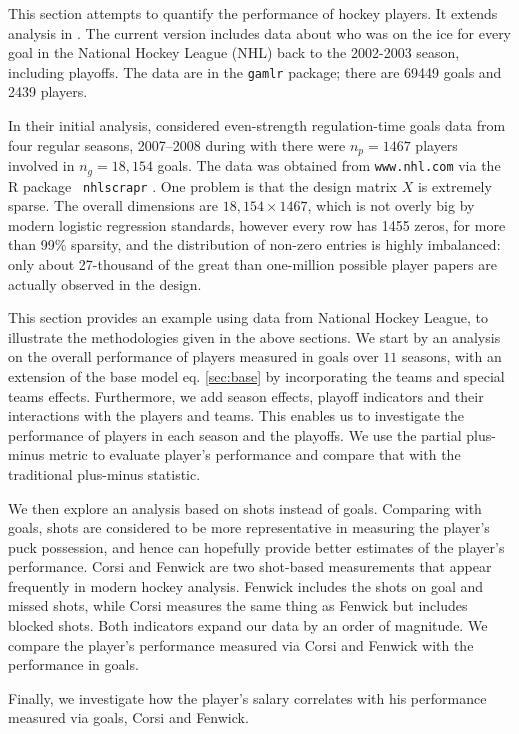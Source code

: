 This section attempts to quantify the
performance of hockey players.  It extends  analysis in
\cite{gramacy:jensen:taddy:2013}.  The current version includes data about who
was on the ice for every goal in the National Hockey League (NHL) back to the
2002-2003 season, including playoffs.  The data
are in the {\tt gamlr} package; there are
69449 goals and 2439 players.

In their
initial analysis, \cite{gramacy:jensen:taddy:2013} considered even-strength
regulation-time goals data from four regular seasons, 2007--2008 during
with there were $n_p = 1467$ players involved in $n_g = 18,\!154$ goals.  The
data was obtained from \verb!www.nhl.com! via the {\sf R} package {\tt
nhlscrapr} \cite{nhlscrapr}. One problem is that the design matrix $X$ is
extremely sparse. The overall dimensions are $18,\!154 \times 1467$, which is
not overly big by modern logistic regression standards, however every row
has 1455 zeros, for more than 99\% sparsity, and the distribution of non-zero
entries is highly imbalanced: only about 27-thousand of the great than
one-million possible player papers are actually observed in the design.  


This section provides an example using data from National Hockey League, to illustrate the methodologies given in the above sections. We start by an analysis on the overall performance of players measured in goals over $11$ seasons, with an extension of the base model eq. \eqref{sec:base} by incorporating the teams and special teams effects. Furthermore, we add season effects, playoff indicators and their interactions with the players and teams. This enables us to investigate the performance of players in each season and the playoffs. We use the partial plus-minus metric to evaluate player's performance and compare that with the traditional plus-minus statistic.

We then explore an analysis based on shots instead of goals. Comparing with goals, shots are considered to be more representative in measuring the player's puck possession, and hence can hopefully provide better estimates of the player's performance. Corsi and Fenwick are two shot-based measurements that appear frequently in modern hockey analysis. Fenwick includes the shots on goal and missed shots, while Corsi measures the same thing as Fenwick but includes blocked shots. Both indicators expand our data by an order of magnitude. We compare the player's performance measured via Corsi and Fenwick with the performance in goals.

Finally, we investigate how the player's salary correlates with his performance measured via goals, Corsi and Fenwick.

